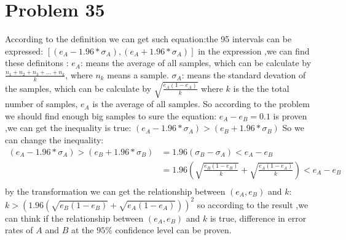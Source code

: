 \documentclass[12pt]{article}
\begin{document}
\section{Problem 35}
According to the definition we can get such equation:the 95%
intervals can be expressed:\newline
$[(e_{A} - 1.96 * \sigma_{A}), (e_{A} + 1.96 * \sigma_{A}) ]$\newline
in the expression ,we can find these definitons :\newline
$e_{A}$: means the average of all samples, which can be calculate by $\frac{n_{1} + n_{2} + n_{3} + ... + n_{k}}{k}$, where $n_{k}$ means a sample.\newline
$\sigma_{A}$: means the standard devation of the samples, which can be calculate by $\sqrt{\frac{e_{A}(1 - e_{A})}{k}}$ where $k$ is the the total number of samples, $e_{A}$ is the average of all samples.\newline
So according to the problem we should find enough big samples to sure the equation: $e_{A} - e_{B} = 0.1$ is proven ,we can get the inequality is true:\newline
$(e_{A} - 1.96 * \sigma_{A}) > (e_{B} + 1.96 * \sigma_{B})$\newline
So we can change the inequality:\newline
		\begin{align*}
			(e_{A} - 1.96 * \sigma_{A}) > (e_{B} + 1.96 * \sigma_{B}) &= 1.96(\sigma_{B} - \sigma_{A}) < e_{A} - e_{B} \\
			&= 1.96(\sqrt{\frac{e_{B}(1 - e_{B})}{k}}+ \sqrt{\frac{e_{A}(1 - e_{A})}{k}}) < e_{A} - e_{B} \\
		\end{align*}
by the transformation we can get the relationship between $(e_{A} , e_{B} )$ and $k$:\newline
$k > (1.96(\sqrt{e_{B}(1 - e_{B})} + \sqrt{e_{A}(1 - e_{A})}))^2$\newline
so according to the result ,we can think if the relationship between $(e_{A},e_{B})$ and $k$ is true, difference in error rates of $A$ and $B$ at the $95\%$ confidence level can be
proven.


\end{document}
